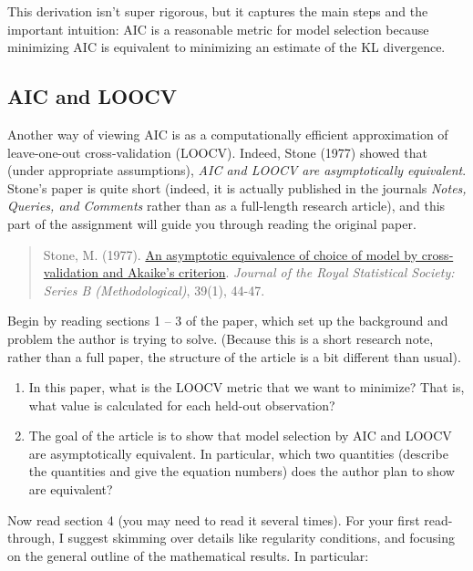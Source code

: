 \documentclass[11pt]{article}
\begin{document}
\noindent This derivation isn't super rigorous, but it captures the main steps and the important intuition: AIC is a reasonable metric for model selection because minimizing AIC is equivalent to minimizing an estimate of the KL divergence.

\subsection*{AIC and LOOCV}

Another way of viewing AIC is as a computationally efficient approximation of leave-one-out cross-validation (LOOCV). Indeed, Stone (1977) showed that (under appropriate assumptions), \textit{AIC and LOOCV are asymptotically equivalent}. Stone's paper is quite short (indeed, it is actually published in the journals \textit{Notes, Queries, and Comments} rather than as a full-length research article), and this part of the assignment will guide you through reading the original paper.\\

\begin{quote}
Stone, M. (1977). \href{https://www.jstor.org/stable/2984877}{An asymptotic equivalence of choice of model by cross‐validation and Akaike's criterion}. \textit{Journal of the Royal Statistical Society: Series B (Methodological)}, 39(1), 44-47.
\end{quote}

\noindent Begin by reading sections 1 -- 3 of the paper, which set up the background and problem the author is trying to solve. (Because this is a short research note, rather than a full paper, the structure of the article is a bit different than usual).

\begin{enumerate}
\item In this paper, what is the LOOCV metric that we want to minimize? That is, what value is calculated for each held-out observation?

\item The goal of the article is to show that model selection by AIC and LOOCV are asymptotically equivalent. In particular, which two quantities (describe the quantities and give the equation numbers) does the author plan to show are equivalent?
\end{enumerate}

\noindent Now read section 4 (you may need to read it several times). For your first read-through, I suggest skimming over details like regularity conditions, and focusing on the general outline of the mathematical results. In particular:
\end{document}
